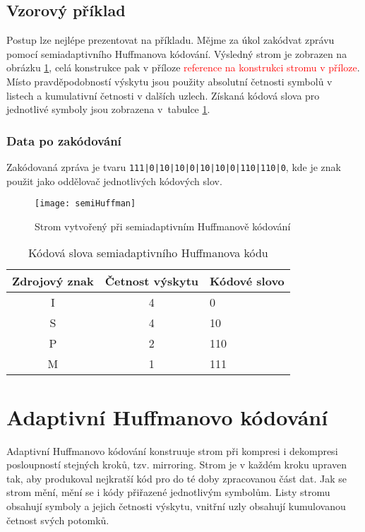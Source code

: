 \subsection{Vzorový příklad}
Postup lze nejlépe prezentovat na příkladu. Mějme za úkol zakódvat zprávu  pomocí semiadaptivního Huffmanova kódování. Výsledný strom je zobrazen na obrázku \ref{semiHuffmanStrom}, celá konstrukce pak v příloze \textcolor{red}{reference na konstrukci stromu v příloze}. Místo pravděpodobností výskytu jsou použity absolutní četnosti symbolů v listech a kumulativní četnosti v dalších uzlech. Získaná kódová slova pro jednotlivé symboly jsou zobrazena v~tabulce \ref{semiHuffmanStrom}.

\subsubsection{Data po zakódování}
Zakódovaná zpráva je tvaru \texttt{111|0|10|10|0|10|10|0|110|110|0}, kde je znak \uv{\texttt{|}} použit jako oddělovač jednotlivých kódových slov.

\begin{figure}[!htb]
\centering
\texttt{[image: semiHuffman]}
\caption{Strom vytvořený při semiadaptivním Huffmanově kódování}
\label{semiHuffmanStrom}
\end{figure}

\begin{table}[!htb]
\centering
\begin{tabular}{|c|c|l|}
\hline
Zdrojový znak & Četnost výskytu & Kódové slovo\\
\hline
I & 4 & 0\\
S & 4 & 10\\
P & 2 & 110\\
M & 1 & 111\\
\hline
\end{tabular}
\caption{Kódová slova semiadaptivního Huffmanova kódu}
\label{semiHuffmanTabulka}
\end{table}

\section{Adaptivní Huffmanovo kódování}
\label{adaptivniHuffman}
Adaptivní Huffmanovo kódování konstruuje strom při kompresi i dekompresi posloupností stejných kroků, tzv. mirroring. Strom je v každém kroku upraven tak, aby produkoval nejkratší kód pro do té doby zpracovanou část dat. Jak se strom mění, mění se i kódy přiřazené jednotlivým symbolům. Listy stromu obsahují symboly a jejich četnosti výskytu, vnitřní uzly obsahují kumulovanou četnost svých potomků.

